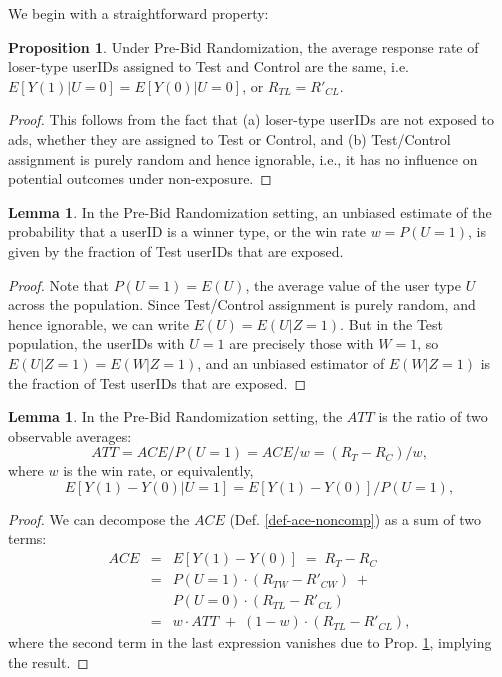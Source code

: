 \documentclass[11pt,a4paper]{article}
\theoremstyle{definition}
\theoremstyle{remark}
\theoremstyle{definition}
\theoremstyle{definition}
\theoremstyle{definition}
\theoremstyle{definition}
\theoremstyle{definition}
\theoremstyle{definition}
\newtheorem{lemma}[theorem]{Lemma}
\newtheorem{proposition}[theorem]{Proposition}
\begin{document}
We begin with a straightforward property:
\begin{proposition} \label{prop-rtl-rcl}\small
Under Pre-Bid Randomization, the average response rate of loser-type userIDs assigned to Test and Control are the same, i.e. $E[Y(1) | U=0] = E[Y(0) | U=0]$, or $R_{TL} = R'_{CL}$.
\begin{proof}
This follows from the fact that (a) loser-type userIDs are not exposed to ads, whether they are assigned to Test or Control, and (b) Test/Control assignment is purely random and hence ignorable, i.e., it has no influence on potential outcomes under non-exposure.
\end{proof}


\end{proposition}

\begin{lemma}
In the Pre-Bid Randomization setting, an unbiased estimate of the probability that a userID is a winner type, or the win rate $w = P(U=1)$, is given by the fraction of Test userIDs that are exposed. 
\begin{proof}
Note that $P(U=1) = E(U)$, the average value of the user type $U$ across the population. Since Test/Control assignment is purely random, and hence ignorable, we can write $E(U) = E(U | Z=1)$. But in the Test population, the userIDs with $U=1$ are precisely those with $W=1$, so $E(U|Z=1) = E(W|Z=1)$, and an unbiased estimator of $E(W|Z=1)$ is the fraction of Test userIDs that are exposed.
\end{proof}
\end{lemma}

\begin{lemma} \label{lem-att-prebid}\small
	In the Pre-Bid Randomization setting, the $ATT$ is the ratio of two observable averages:
\begin{equation}
ATT = ACE/P(U=1) = ACE/w = (R_T - R_C)/w, 	\label{eq-att-prebid}
\end{equation}
where $w$ is the win rate, or equivalently, 
\begin{equation}
E[Y(1) - Y(0) | U=1] = E[Y(1) - Y(0)]/P(U=1), 	\label{eq-att-prebid-expec}
\end{equation}


\begin{proof}\small
We can decompose the $ACE$ (Def. \ref{def-ace-noncomp}) as a sum of two terms:
\begin{eqnarray}
ACE &= & E[ Y(1) - Y(0) ] \; = \; R_T - R_C \\
	&= & P(U=1)\cdot (R_{TW} - R'_{CW}) \; +\; \\
	&  &  P(U=0)\cdot (R_{TL} - R'_{CL})  \\
    &= & w \cdot ATT \; + \; (1-w) \cdot (R_{TL} - R'_{CL}),
\end{eqnarray}
where the second term in the last expression vanishes due to Prop. \ref{prop-rtl-rcl}, implying the result.
\end{proof}
\end{lemma}
\end{document}
